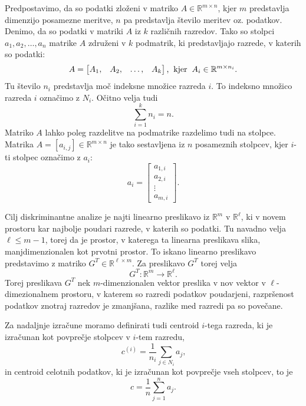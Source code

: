 \documentclass[mat1]{article}
\theoremstyle{definition}
\begin{document}
Predpostavimo, da so podatki zloženi v matriko $A \in \mathbb{R}^{m \times n}$, kjer $m$ predstavlja dimenzijo posamezne meritve, $n$ pa predstavlja število meritev oz. podatkov. Denimo, da so podatki v matriki $A$ iz $k$ različnih razredov. Tako so stolpci $a_1, a_2, \ldots, a_n$ matrike $A$ združeni v $k$ podmatrik, ki predstavljajo razrede, v katerih so podatki:
$$ A = 
\begin{bmatrix}
A_1, & A_2, & \ldots, & A_k
\end{bmatrix} \text{,}
\hspace{2mm} \text{kjer} \hspace{2mm} A_i \in \mathbb{R}^{m \times n_i} \text{.}
$$ 
Tu število $n_i$ predstavlja moč indeksne množice razreda $i$. To indeksno množico razreda $i$ označimo z $N_i$. Očitno velja tudi $$
\sum_{i=1}^{k}n_i = n \text{.}$$
Matriko $A$ lahko poleg razdelitve na podmatrike razdelimo tudi na stolpce. Matrika $A = \left[ a_{i ,j} \right]  \in \mathbb{R}^{m \times n}$ je tako sestavljena iz $n$ posameznih stolpcev, kjer $i$-ti stolpec označimo z $a_i$:
$$ a_i =
\begin{bmatrix}
a_{1, i} \\
a_{2, i} \\
\vdots \\
a_{m, i}
\end{bmatrix}
\text{.}
$$

Cilj diskriminantne analize je najti linearno preslikavo iz $\mathbb{R}^m$ v $\mathbb{R}^\ell$, ki v novem prostoru kar najbolje poudari razrede, v katerih so podatki. Tu navadno velja $\ell \leq m - 1$, torej da je prostor, v katerega ta linearna preslikava slika, manjdimenzionalen kot prvotni prostor. To iskano linearno preslikavo predstavimo z matriko $G^T \in \mathbb{R}^{\ell \times m}$.
Za preslikavo $G^T$ torej velja $$G^T : \mathbb{R}^m \rightarrow \mathbb{R}^\ell \text{.}$$ Torej preslikava $G^T$ nek $m$-dimenzionalen vektor preslika v nov vektor v $\ell$-dimezionalnem prostoru, v katerem so razredi podatkov poudarjeni, razpršenost podatkov znotraj razredov je zmanjšana, razlike med razredi pa so povečane.

Za nadaljnje izračune moramo definirati tudi centroid $i$-tega razreda, ki je izračunan kot povprečje stolpcev v $i$-tem razredu, 
$$c^{(i)} = \frac{1}{n_i} \sum_{j \in N_i} a_j \text{,}
$$
in centroid celotnih podatkov, ki je izračunan kot povprečje vseh stolpcev, to je
$$c = \frac{1}{n} \sum_{j = 1}^{n} a_j \text{.}
$$
\end{document}
